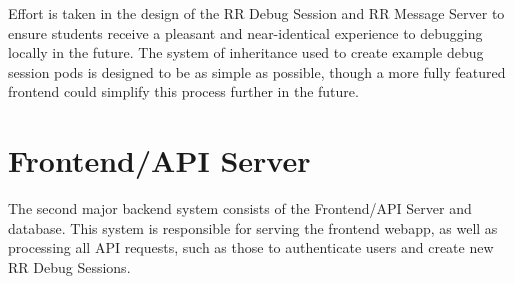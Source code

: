 \documentclass[12pt]{article}
\begin{document}
Effort is taken in the design of the RR Debug Session and RR Message
Server to ensure students receive a pleasant and near-identical
experience to debugging locally in the future.  The system of
inheritance used to create example debug session pods is designed to
be as simple as possible, though a more fully featured frontend could
simplify this process further in the future.






\section{Frontend/API Server}\label{api}

The second major backend system consists of the Frontend/API Server
and database.  This system is responsible for serving the frontend
webapp, as well as processing all API requests, such as those to
authenticate users and create new RR Debug Sessions.
\end{document}
